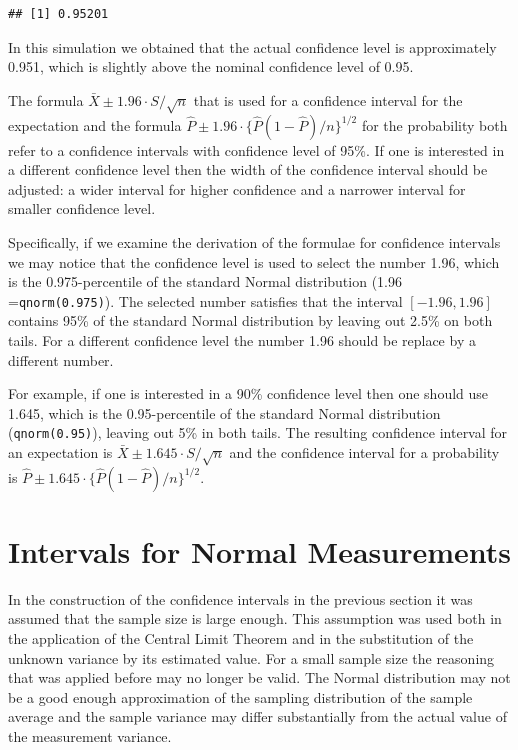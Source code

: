 \documentclass[]{krantz}
\theoremstyle{definition}
\theoremstyle{definition}
\theoremstyle{definition}
\theoremstyle{remark}
\begin{document}
\begin{verbatim}
## [1] 0.95201
\end{verbatim}

In this simulation we obtained that the actual confidence level is
approximately 0.951, which is slightly above the nominal confidence
level of 0.95.

The formula \(\bar X \pm 1.96 \cdot S/\sqrt{n}\) that is used for a
confidence interval for the expectation and the formula
\(\hat P \pm 1.96 \cdot \{\hat P (1-\hat P)/n\}^{1/2}\) for the
probability both refer to a confidence intervals with confidence level
of 95\%. If one is interested in a different confidence level then the
width of the confidence interval should be adjusted: a wider interval
for higher confidence and a narrower interval for smaller confidence
level.

Specifically, if we examine the derivation of the formulae for
confidence intervals we may notice that the confidence level is used to
select the number 1.96, which is the 0.975-percentile of the standard
Normal distribution (1.96 =\texttt{qnorm(0.975)}). The selected number
satisfies that the interval \([-1.96,1.96]\) contains 95\% of the
standard Normal distribution by leaving out 2.5\% on both tails. For a
different confidence level the number 1.96 should be replace by a
different number.

For example, if one is interested in a 90\% confidence level then one
should use 1.645, which is the 0.95-percentile of the standard Normal
distribution (\texttt{qnorm(0.95)}), leaving out 5\% in both tails. The
resulting confidence interval for an expectation is
\(\bar X \pm 1.645 \cdot S/\sqrt{n}\) and the confidence interval for a
probability is \(\hat P \pm 1.645 \cdot \{\hat P (1-\hat P)/n\}^{1/2}\).

\section{Intervals for Normal Measurements}\label{CInormal}

In the construction of the confidence intervals in the previous section
it was assumed that the sample size is large enough. This assumption was
used both in the application of the Central Limit Theorem and in the
substitution of the unknown variance by its estimated value. For a small
sample size the reasoning that was applied before may no longer be
valid. The Normal distribution may not be a good enough approximation of
the sampling distribution of the sample average and the sample variance
may differ substantially from the actual value of the measurement
variance.
\end{document}
